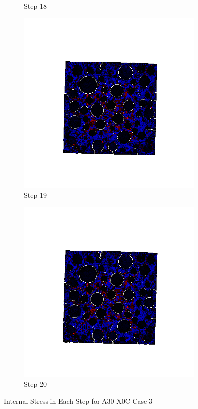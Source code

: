 \begin{figure}[ht!]
\begin{subfigure}{.25\textwidth}
      \caption{Step 18}
      \end{subfigure}%
      \begin{subfigure}{.25\textwidth}
        \centering
        \includegraphics[width=1.0\linewidth]{Files/A30X0C_3_IS/DEP50-STEP(019).png}
      \caption{Step 19}
      \end{subfigure}%
      \begin{subfigure}{.25\textwidth}
        \centering
        \includegraphics[width=1.0\linewidth]{Files/A30X0C_3_IS/DEP50-STEP(020).png}
      \caption{Step 20}
      \end{subfigure}

  \caption{Internal Stress in Each Step for A30 X0C Case 3}
  \label{fig:DEF_A30X0C_3_IS}
  \end{figure}


